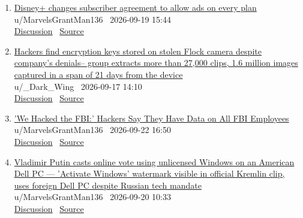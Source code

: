 \documentclass[11pt,a4paper]{article}
\begin{document}
\begin{enumerate}
  \item \href{https://www.reddit.com/r/technology/comments/1wkpix4/disney_changes_subscriber_agreement_to_allow_ads/}{Disney+ changes subscriber agreement to allow ads on every plan}\\ {\small u/MarvelsGrantMan136 \textbullet\ 2026-09-19 15:44}\\ {\small \href{https://www.reddit.com/r/technology/comments/1wkpix4/disney_changes_subscriber_agreement_to_allow_ads/}{Discussion} \textbullet\ \href{https://www.dexerto.com/tv-movies/disney-changes-subscriber-agreement-to-allow-ads-on-every-plan-3410354/}{Source}}
  \item \href{https://www.reddit.com/r/technology/comments/1wiv3uy/hackers_find_encryption_keys_stored_on_stolen/}{Hackers find encryption keys stored on stolen Flock camera despite company's denials-- group extracts more than 27,000 clips, 1.6 million images captured in a span of 21 days from the device}\\ {\small u/\_Dark\_Wing \textbullet\ 2026-09-17 14:10}\\ {\small \href{https://www.reddit.com/r/technology/comments/1wiv3uy/hackers_find_encryption_keys_stored_on_stolen/}{Discussion} \textbullet\ \href{https://www.tomshardware.com/tech-industry/cyber-security/hackers-find-encryption-key-stored-on-flock-camera-group-extracts-more-than-27-000-clips-1-6-million-images-captured-in-a-span-of-21-days-from-device}{Source}}
  \item \href{https://www.reddit.com/r/technology/comments/1wnevnd/we_hacked_the_fbi_hackers_say_they_have_data_on/}{'We Hacked the FBI:' Hackers Say They Have Data on All FBI Employees}\\ {\small u/MarvelsGrantMan136 \textbullet\ 2026-09-22 16:50}\\ {\small \href{https://www.reddit.com/r/technology/comments/1wnevnd/we_hacked_the_fbi_hackers_say_they_have_data_on/}{Discussion} \textbullet\ \href{https://www.404media.co/we-hacked-the-fbi-hackers-say-they-have-data-on-all-fbi-employees/}{Source}}
  \item \href{https://www.reddit.com/r/technology/comments/1wldlr7/vladimir_putin_casts_online_vote_using_unlicensed/}{Vladimir Putin casts online vote using unlicensed Windows on an American Dell PC --- 'Activate Windows' watermark visible in official Kremlin clip, uses foreign Dell PC despite Russian tech mandate}\\ {\small u/MarvelsGrantMan136 \textbullet\ 2026-09-20 10:33}\\ {\small \href{https://www.reddit.com/r/technology/comments/1wldlr7/vladimir_putin_casts_online_vote_using_unlicensed/}{Discussion} \textbullet\ \href{https://www.tomshardware.com/software/windows/putin-casts-online-vote-using-unlicensed-windows-on-an-american-dell-pc-activate-windows-watermark-visible-in-official-kremlin-clip-uses-foreign-dell-pc-despite-russian-tech-mandate}{Source}}

\end{enumerate}
\end{document}
